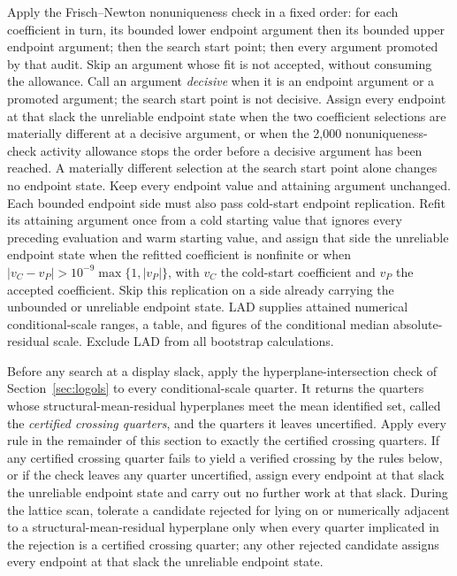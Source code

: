 \documentclass[11pt]{article}
\begin{document}
Apply the Frisch--Newton nonuniqueness check in a fixed order: for each coefficient in turn, its
bounded lower endpoint argument then its bounded upper endpoint argument; then the search start point; then
every argument promoted by that audit. Skip an argument whose fit is not accepted, without
consuming the allowance. Call an argument \emph{decisive} when it is an endpoint argument or a
promoted argument; the search start point is not decisive. Assign every endpoint at that slack the
unreliable endpoint state when the two coefficient selections are materially different at a decisive
argument, or when the 2,000 nonuniqueness-check activity allowance stops the order before a decisive
argument has been reached. A materially different selection at the search start point alone changes no
endpoint state. Keep every endpoint value and attaining argument unchanged. Each bounded endpoint side must also pass cold-start endpoint replication. Refit its attaining
argument once from a cold starting value that ignores every preceding evaluation and warm starting value,
and assign that side the unreliable endpoint state when the refitted coefficient is nonfinite or when
\(|v_C-v_P|>10^{-9}\max\{1,|v_P|\}\), with \(v_C\) the cold-start coefficient and \(v_P\) the
accepted coefficient. Skip this replication on a side already carrying the unbounded or unreliable
endpoint state. LAD supplies attained numerical conditional-scale ranges, a table, and figures of the conditional median
absolute-residual scale. Exclude LAD from all bootstrap calculations.

Before any search at a display slack, apply the hyperplane-intersection check of
Section~\ref{sec:logols} to every conditional-scale quarter. It returns the quarters whose
structural-mean-residual hyperplanes meet the mean identified set, called the \emph{certified
crossing quarters}, and the quarters it leaves uncertified. Apply every rule in the remainder of this
section to exactly the certified crossing quarters. If any certified crossing quarter fails to yield
a verified crossing by the rules below, or if the check leaves any quarter uncertified, assign every
endpoint at that slack the unreliable endpoint state and carry out no further work at that slack.
During the lattice scan, tolerate a candidate rejected for lying on or numerically adjacent to a
structural-mean-residual hyperplane only when every quarter implicated in the rejection is a certified
crossing quarter; any other rejected candidate assigns every endpoint at that slack the unreliable
endpoint state.
\end{document}

